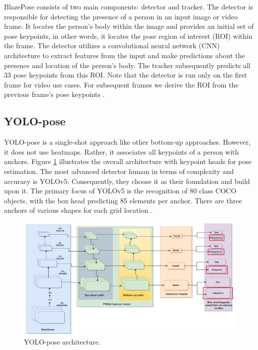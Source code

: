 BlazePose consists of two main components: detector and tracker. The detector is responsible for detecting the presence of a person in an input image or video frame. It locates the person's body within the image and provides an initial set of pose keypoints, in other words, it locates the pose region of interest (ROI) within the frame.
The detector utilizes a convolutional neural network (CNN) architecture to extract features from the input and make predictions about the presence and location of the person's body. The tracker subsequently predicts all 33 pose keypoints from this ROI. Note that the detector is run only on the first frame for video use cases. For subsequent frames we derive the ROI from the previous frame's pose keypoints \parencite{url:BlazePose}.

\subsection{YOLO-pose}
\label{subsec:yolopose}

YOLO-pose is a single-shot approach like other bottom-up approaches. However, it does not use heatmaps. Rather, it associates all keypoints of a person with anchors. Figure \ref{fig:YOLO-pose-architecture} illustrates the overall architecture with keypoint
heads for pose estimation. The most advanced detector human in terms of complexity and accuracy is YOLOv5. Consequently, they choose it as their foundation and build upon it.
The primary focus of YOLOv5 is the recognition of 80 class COCO objects, with the box head predicting 85 elements per anchor. There are three anchors of various shapes for each grid location \parencite{maji2022yolopose}.

\begin{figure}[ht]
  \centering
  \includegraphics[scale=1.01]{gambar/yolo-architecture.png}
  \caption{YOLO-pose architecture.}
  \label{fig:YOLO-pose-architecture}
\end{figure}

